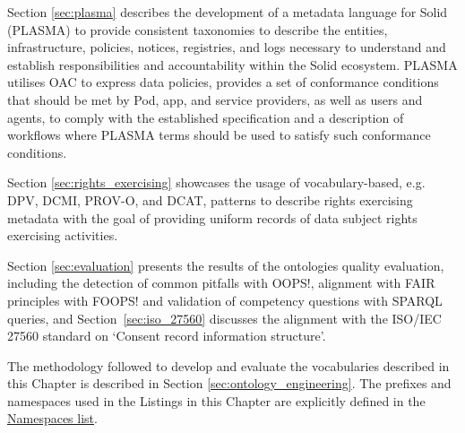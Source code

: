 Section \ref{sec:plasma} describes the development of a metadata language for Solid (PLASMA) to provide consistent taxonomies to describe the entities, infrastructure, policies, notices, registries, and logs necessary to understand and establish responsibilities and accountability within the Solid ecosystem.
PLASMA utilises OAC to express data policies, provides a set of conformance conditions that should be met by Pod, app, and service providers, as well as users and agents, to comply with the established specification and a description of workflows where PLASMA terms should be used to satisfy such conformance conditions.

Section \ref{sec:rights_exercising} showcases the usage of vocabulary-based, e.g. DPV, DCMI, PROV-O, and DCAT, patterns to describe rights exercising metadata with the goal of providing uniform records of data subject rights exercising activities.

Section \ref{sec:evaluation} presents the results of the ontologies quality evaluation, including the detection of common pitfalls with OOPS!, alignment with FAIR principles with FOOPS! and validation of competency questions with SPARQL queries, and Section~\ref{sec:iso_27560} discusses the alignment with the ISO/IEC 27560 standard on `Consent record information structure'.

The methodology followed to develop and evaluate the vocabularies described in this Chapter is described in Section \ref{sec:ontology_engineering}.
The prefixes and namespaces used in the Listings in this Chapter are explicitly defined in the \hyperref[sec:namespaces]{Namespaces list}.






